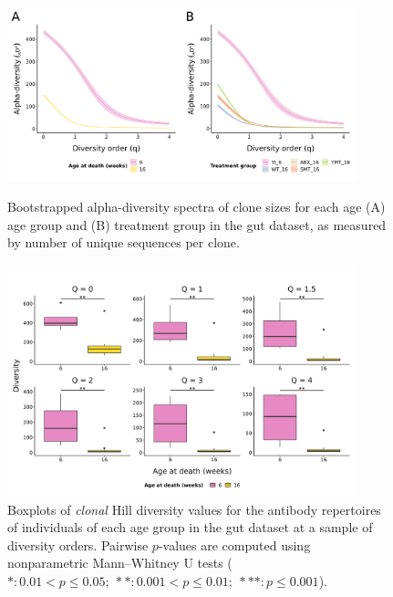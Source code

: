 \begin{figure}
\centering
\includegraphics[width = 0.9\textwidth]{_Figures/png/igseq-gut-clone-diversity-alpha}
\begin{subfigure}{0em}
\label{fig:igseq-gut-clone-diversity-alpha-age}
\end{subfigure}
\begin{subfigure}{0em}
\label{fig:igseq-gut-clone-diversity-alpha-groups}
\end{subfigure}
\caption{Bootstrapped alpha-diversity spectra of clone sizes for each age (A) age group and (B) treatment group in the \igseq gut dataset, as measured by number of unique sequences per clone.}
\label{fig:igseq-gut-clone-diversity-alpha}
\end{figure}

\begin{figure}
\centering
\includegraphics[width = 0.9\textwidth]{_Figures/png/igseq-gut-clone-diversity-solo-age}
\caption{Boxplots of \textit{clonal} Hill diversity values for the antibody repertoires of individuals of each age group in the \igseq gut dataset at a sample of diversity orders. Pairwise $p$-values are computed using nonparametric Mann–Whitney U tests ($*: 0.01 < p \leq 0.05;~**: 0.001 < p \leq 0.01;~***: p \leq 0.001$).}
\label{fig:igseq-gut-clone-diversity-solo-age}
\end{figure}

